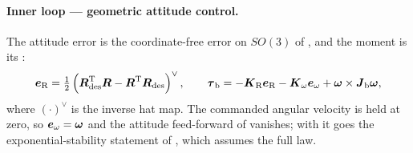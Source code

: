 \paragraph{Inner loop --- geometric attitude control.} The attitude error is the coordinate-free
error on $SO(3)$ of \parencite[Eq.~(21)]{lee2010geometric}, and the moment is its
\parencite[Eq.~(20)]{lee2010geometric}:
\begin{equation}\label{eq:method:dep:inner}
  \boldsymbol{e}_{\textrm{R}} = \tfrac{1}{2}\left(\boldsymbol{R}_{\textrm{des}}^{\textrm{T}}\boldsymbol{R} - \boldsymbol{R}^{\textrm{T}}\boldsymbol{R}_{\textrm{des}}\right)^{\vee},
  \qquad
  \boldsymbol{\tau}_{\textrm{b}} = -\boldsymbol{K}_{\textrm{R}}\boldsymbol{e}_{\textrm{R}} - \boldsymbol{K}_{\omega}\boldsymbol{e}_{\omega}
      + \boldsymbol{\omega}\times\boldsymbol{J}_{\textrm{b}}\boldsymbol{\omega},
\end{equation}
where $(\cdot)^{\vee}$ is the inverse hat map. The commanded angular velocity is held at zero, so
$\boldsymbol{e}_{\omega} = \boldsymbol{\omega}$ and the attitude feed-forward of
\parencite[Eq.~(20)]{lee2010geometric} vanishes; with it goes the exponential-stability statement of
\parencite[Prop.~3]{lee2010geometric}, which assumes the full law.

